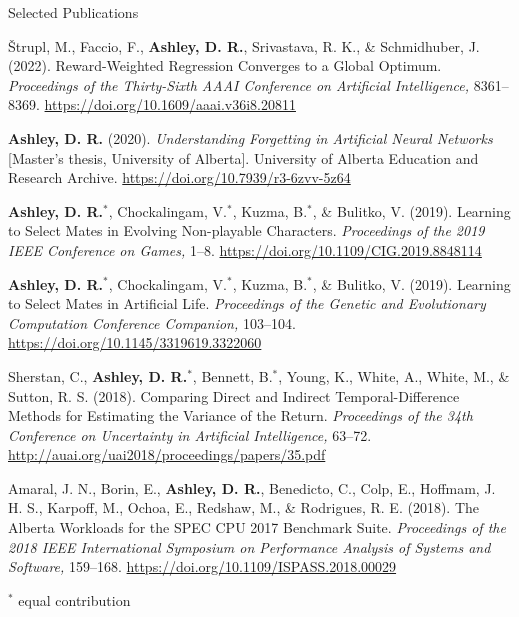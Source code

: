 \documentclass{cv}
\begin{document}
\begin{rSection}{Selected Publications}

\begin{rPublications}
    \item
        {\v{S}}trupl, M., Faccio, F., \textbf{Ashley, D. R.}, Srivastava, R. K., \& Schmidhuber, J.
        (2022).
        Reward-Weighted Regression Converges to a Global Optimum.
        \textit{Proceedings of the Thirty-Sixth AAAI Conference on Artificial Intelligence,} 8361--8369.
        \url{https://doi.org/10.1609/aaai.v36i8.20811}
    \item
        \textbf{Ashley, D. R.}
        (2020).
        \textit{Understanding Forgetting in Artificial Neural Networks} [Master's  thesis,  University  of  Alberta].
        University of Alberta Education and Research Archive.
        \url{https://doi.org/10.7939/r3-6zvv-5z64}
    \item
        \textbf{Ashley, D. R.}$^*$, Chockalingam, V.$^*$, Kuzma, B.$^*$, \& Bulitko, V.
        (2019).
        Learning to Select Mates in Evolving Non-playable Characters.
        \textit{Proceedings of the 2019 IEEE Conference on Games,} 1--8.
        \url{https://doi.org/10.1109/CIG.2019.8848114}
    \item
        \textbf{Ashley, D. R.}$^*$, Chockalingam, V.$^*$, Kuzma, B.$^*$, \& Bulitko, V.
        (2019).
        Learning to Select Mates in Artificial Life.
        \textit{Proceedings of the Genetic and Evolutionary Computation Conference Companion,} 103--104.
        \url{https://doi.org/10.1145/3319619.3322060}
    \item
        Sherstan, C., \textbf{Ashley, D. R.}$^*$, Bennett, B.$^*$, Young, K., White, A., White, M., \& Sutton, R. S.
        (2018).
        Comparing Direct and Indirect Temporal-Difference Methods for Estimating the Variance of the Return.
        \textit{Proceedings of the 34th Conference on Uncertainty in Artificial Intelligence,} 63--72.
        \url{http://auai.org/uai2018/proceedings/papers/35.pdf}
    \item
        Amaral, J. N., Borin, E., \textbf{Ashley, D. R.}, Benedicto, C., Colp, E., Hoffmam, J. H. S., Karpoff, M., Ochoa, E., Redshaw, M., \& Rodrigues, R. E.
        (2018).
        The Alberta Workloads for the SPEC CPU 2017 Benchmark Suite.
        \textit{Proceedings of the 2018 IEEE International Symposium on Performance Analysis of Systems and Software,} 159--168.
        \url{https://doi.org/10.1109/ISPASS.2018.00029}
\end{rPublications}

\vspace{-0.3em} \hfill $^*$ \footnotesize{equal contribution} \vspace{-0.7em}

\end{rSection}
\end{document}
